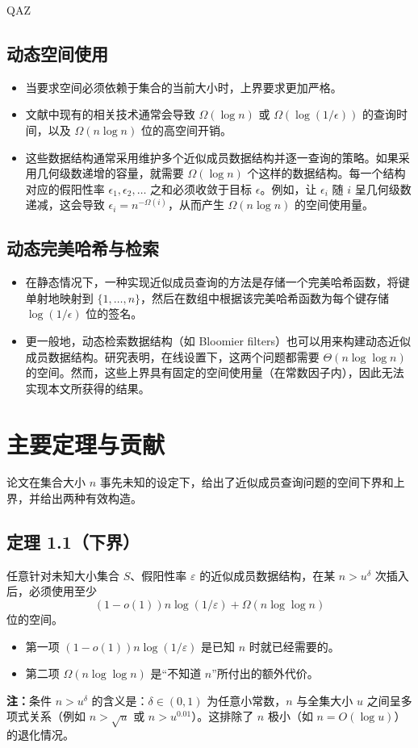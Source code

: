 QAZ\documentclass[UTF8,11pt,a4paper]{ctexart}
\begin{document}
\subsection{动态空间使用}
\begin{itemize}
    \item 当要求空间必须依赖于集合的当前大小时，上界要求更加严格。
    \item 文献中现有的相关技术通常会导致 $\Omega(\log n)$ 或 $\Omega(\log(1/\epsilon))$ 的查询时间，以及 $\Omega(n\log n)$ 位的高空间开销。
    \item 这些数据结构通常采用维护多个近似成员数据结构并逐一查询的策略。如果采用几何级数递增的容量，就需要 $\Omega(\log n)$ 个这样的数据结构。每一个结构对应的假阳性率 $\epsilon_1, \epsilon_2, \dots$ 之和必须收敛于目标 $\epsilon$。例如，让 $\epsilon_i$ 随 $i$ 呈几何级数递减，这会导致 $\epsilon_i = n^{-\Omega(i)}$，从而产生 $\Omega(n\log n)$ 的空间使用量。
\end{itemize}
\subsection{动态完美哈希与检索}
\begin{itemize}
    \item 在静态情况下，一种实现近似成员查询的方法是存储一个完美哈希函数，将键单射地映射到 $\{1,\dots,n\}$，然后在数组中根据该完美哈希函数为每个键存储 $\log(1/\epsilon)$ 位的签名。
    \item 更一般地，动态检索数据结构（如 Bloomier filters）也可以用来构建动态近似成员数据结构。研究表明，在线设置下，这两个问题都需要 $\Theta(n\log\log n)$ 的空间。然而，这些上界具有固定的空间使用量（在常数因子内），因此无法实现本文所获得的结果。
\end{itemize}
\section{主要定理与贡献}
论文在集合大小 $n$ 事先未知的设定下，给出了近似成员查询问题的空间下界和上界，并给出两种有效构造。
\subsection{定理 1.1（下界）}
任意针对未知大小集合 $S$、假阳性率 $\varepsilon$ 的近似成员数据结构，在某 $n>u^\delta$ 次插入后，必须使用至少
\[
(1-o(1))n\log(1/\varepsilon)+\Omega(n\log\log n)
\]
位的空间。
\begin{itemize}
    \item 第一项 $(1-o(1))n\log(1/\varepsilon)$ 是已知 $n$ 时就已经需要的。
    \item 第二项 $\Omega(n\log\log n)$ 是“不知道 $n$”所付出的额外代价。
\end{itemize}
\textbf{注：}条件 $n>u^\delta$ 的含义是：$\delta\in(0,1)$ 为任意小常数，$n$ 与全集大小 $u$ 之间呈多项式关系（例如 $n>\sqrt{u}$ 或 $n>u^{0.01}$）。这排除了 $n$ 极小（如 $n=O(\log u)$）的退化情况。
\end{document}
